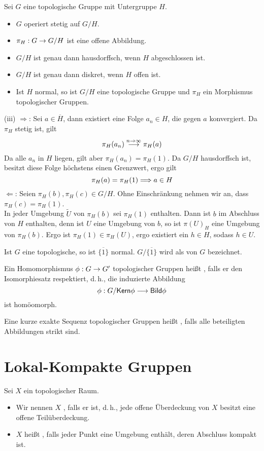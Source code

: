 \documentclass{book}
\begin{document}
\Prop{}
\label{Prop1.1.8}
Sei $G$ eine topologische Gruppe mit Untergruppe $H$.
\begin{itemize}
\item $G$ operiert stetig auf $G/H$.
\item $\pi_H : G \overset{}{\rightarrow} G/H$ ist eine offene Abbildung.
\item $G/H$ ist genau dann hausdorffsch, wenn $H$ abgeschlossen ist.
\item $G/H$ ist genau dann diskret, wenn $H$ offen ist.
\item Ist $H$ normal, so ist $G/H$ eine topologische Gruppe und $\pi_H$ ein Morphismus topologischer Gruppen.
\end{itemize}
\begin{Beweis}{(iii)}
 $\Longrightarrow$: Sei $a \in \overline{H}$, dann existiert eine Folge $a_n \in H$, die gegen $a$ konvergiert. Da $\pi_H$ stetig ist, gilt
\[ \pi_H(a_n) \overset{n\overset{}{\rightarrow} \infty}{\longrightarrow} \pi_H(a) \]
Da alle $a_n$ in $H$ liegen, gilt aber $\pi_H(a_n) = \pi_H(1)$. Da $G/H$ hausdorffsch ist, besitzt diese Folge höchstens einen Grenzwert, ergo gilt
\[ \pi_H(a) = \pi_H(1) \overset{}{\Longrightarrow} a \in H \]
$\Longleftarrow$: Seien $\pi_H(b),\pi_H(c) \in G/H$. Ohne Einschränkung nehmen wir an, dass $\pi_H(c) = \pi_H(1)$.\\
In jeder Umgebung $\widetilde{U}$ von $\pi_H(b)$ sei $\pi_H(1)$ enthalten. Dann ist $b$ im Abschluss von $H$ enthalten, denn ist $U$ eine Umgebung von $b$, so ist $\pi(U)_H$ eine Umgebung von $\pi_H(b)$. Ergo ist $\pi_H(1) \in \pi_H(U)$, ergo existiert ein $h \in H$, sodass $h \in U$.
\end{Beweis}

\Def{}
Ist $G$ eine topologische, so ist $\overline{\{1\}}$ normal. $G/\overline{\{1\}}$ wird als  von $G$ bezeichnet.

\Def{}
Ein Homomorphismus $\phi : G \overset{}{\rightarrow} G'$ topologischer Gruppen heißt , falls er den Isomorphiesatz respektiert, d.\,h., die induzierte Abbildung
\[ \phi : G / \textsf{Kern} \phi \overset{}{\longrightarrow} \textsf{Bild} \phi \]
ist homöomorph.

\Def{}
Eine kurze exakte Sequenz topologischer Gruppen heißt , falls alle beteiligten Abbildungen strikt sind.

\section{Lokal-Kompakte Gruppen}
\Def{}
Sei $X$ ein topologischer Raum.
\begin{itemize}
\item Wir nennen $X$ , falls er  ist, d.\,h., jede offene Überdeckung von $X$ besitzt eine offene Teilüberdeckung.
\item $X$ heißt , falls jeder Punkt eine Umgebung enthält, deren Abschluss kompakt ist.
\end{itemize}
\end{document}
